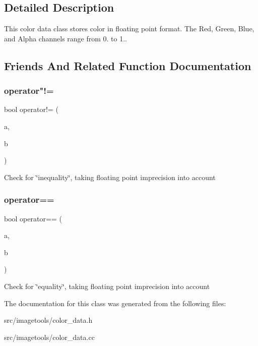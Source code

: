 \subsection{Detailed Description}
This color data class stores color in floating point format. The Red, Green, Blue, and Alpha channels range from 0. to 1.. 

\subsection{Friends And Related Function Documentation}
\mbox{\label{classimage__tools_1_1ColorData_a698ac263a286afe37e3b9ed0c5882c8c}} 
\subsubsection{\texorpdfstring{operator"!=}{operator!=}}
{\footnotesize\ttfamily bool operator!= (\begin{DoxyParamCaption}\item[{const \hyperlink{classimage__tools_1_1ColorData}{Color\+Data} \&}]{a,  }\item[{const \hyperlink{classimage__tools_1_1ColorData}{Color\+Data} \&}]{b }\end{DoxyParamCaption})\hspace{0.3cm}{\ttfamily [friend]}}

Check for \char`\"{}inequality\char`\"{}, taking floating point imprecision into account \mbox{\label{classimage__tools_1_1ColorData_a9dae9e77610393d100312c9d248f09cc}} 
\subsubsection{\texorpdfstring{operator==}{operator==}}
{\footnotesize\ttfamily bool operator== (\begin{DoxyParamCaption}\item[{const \hyperlink{classimage__tools_1_1ColorData}{Color\+Data} \&}]{a,  }\item[{const \hyperlink{classimage__tools_1_1ColorData}{Color\+Data} \&}]{b }\end{DoxyParamCaption})\hspace{0.3cm}{\ttfamily [friend]}}

Check for \char`\"{}equality\char`\"{}, taking floating point imprecision into account 

The documentation for this class was generated from the following files\+:\begin{DoxyCompactItemize}
\item 
src/imagetools/color\+\_\+data.\+h\item 
src/imagetools/color\+\_\+data.\+cc\end{DoxyCompactItemize}
